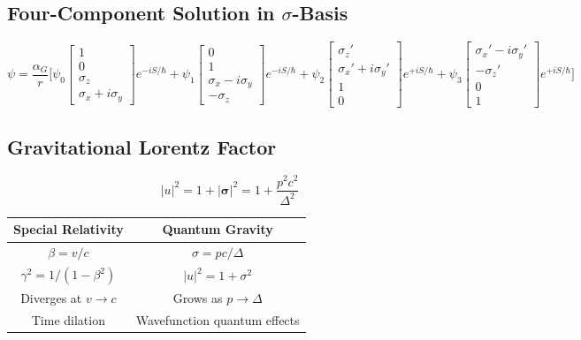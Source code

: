 \documentclass[11pt,a4paper]{article}
\theoremstyle{definition}
\theoremstyle{remark}
\begin{document}
	\subsection{Four-Component Solution in $\sigma$-Basis}
	
	\begin{equation}
		\psi = \frac{\alpha_G}{r}\Bigg[
		\psi_0\begin{bmatrix}1\\0\\\sigma_z\\\sigma_x+i\sigma_y\end{bmatrix}e^{-iS/\hbar}
		+\psi_1\begin{bmatrix}0\\1\\\sigma_x-i\sigma_y\\-\sigma_z\end{bmatrix}e^{-iS/\hbar}
		+\psi_2\begin{bmatrix}\sigma_z'\\\sigma_x'+i\sigma_y'\\1\\0\end{bmatrix}e^{+iS/\hbar}
		+\psi_3\begin{bmatrix}\sigma_x'-i\sigma_y'\\-\sigma_z'\\0\\1\end{bmatrix}e^{+iS/\hbar}
		\Bigg]
	\end{equation}
	
	\subsection{Gravitational Lorentz Factor}
	
	\begin{equation}
		\boxed{|u|^2 = 1+|\boldsymbol{\sigma}|^2 = 1+\frac{p^2c^2}{\Delta^2}}
		\label{eq:gravitational_lorentz_factor}
	\end{equation}
	
	\begin{center}
		\begin{tabular}{c|c}
			\textbf{Special Relativity} & \textbf{Quantum Gravity} \\
			\hline
			$\beta = v/c$ & $\sigma = pc/\Delta$ \\
			$\gamma^2 = 1/(1-\beta^2)$ & $|u|^2 = 1+\sigma^2$ \\
			Diverges at $v\to c$ & Grows as $p\to\Delta$ \\
			Time dilation & Wavefunction quantum effects \\
		\end{tabular}
	\end{center}
	
\end{document}
